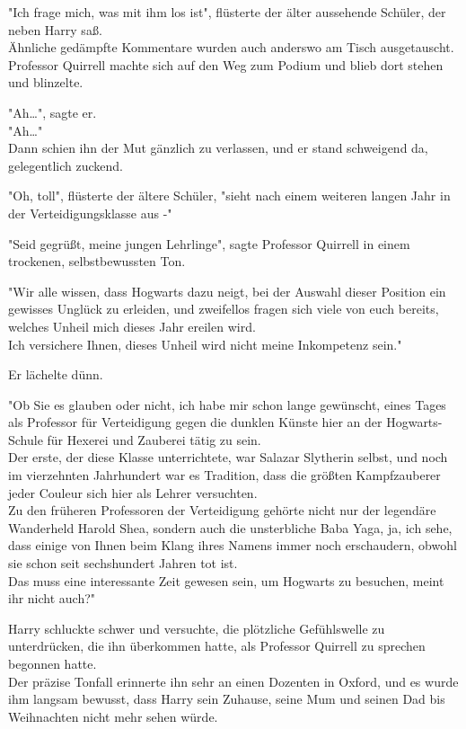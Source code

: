 {"Ich frage mich, was mit ihm los ist", flüsterte der älter aussehende Schüler, der neben Harry saß.\\ Ähnliche gedämpfte Kommentare wurden auch anderswo am Tisch ausgetauscht. Professor Quirrell machte sich auf den Weg zum Podium und blieb dort stehen und blinzelte.

"Ah…", sagte er.\\ "Ah…"\\ Dann schien ihn der Mut gänzlich zu verlassen, und er stand schweigend da, gelegentlich zuckend.

"Oh, toll", flüsterte der ältere Schüler, "sieht nach einem weiteren langen Jahr in der Verteidigungsklasse aus -"

"Seid gegrüßt, meine jungen Lehrlinge", sagte Professor Quirrell in einem trockenen, selbstbewussten Ton.

"Wir alle wissen, dass Hogwarts dazu neigt, bei der Auswahl dieser Position ein gewisses Unglück zu erleiden, und zweifellos fragen sich viele von euch bereits, welches Unheil mich dieses Jahr ereilen wird.\\ Ich versichere Ihnen, dieses Unheil wird nicht meine Inkompetenz sein."

Er lächelte dünn.

"Ob Sie es glauben oder nicht, ich habe mir schon lange gewünscht, eines Tages als Professor für Verteidigung gegen die dunklen Künste hier an der Hogwarts-Schule für Hexerei und Zauberei tätig zu sein.\\ Der erste, der diese Klasse unterrichtete, war Salazar Slytherin selbst, und noch im vierzehnten Jahrhundert war es Tradition, dass die größten Kampfzauberer jeder Couleur sich hier als Lehrer versuchten.\\ Zu den früheren Professoren der Verteidigung gehörte nicht nur der legendäre Wanderheld Harold Shea, sondern auch die unsterbliche Baba Yaga, ja, ich sehe, dass einige von Ihnen beim Klang ihres Namens immer noch erschaudern, obwohl sie schon seit sechshundert Jahren tot ist.\\ Das muss eine interessante Zeit gewesen sein, um Hogwarts zu besuchen, meint ihr nicht auch?"

Harry schluckte schwer und versuchte, die plötzliche Gefühlswelle zu unterdrücken, die ihn überkommen hatte, als Professor Quirrell zu sprechen begonnen hatte.\\ Der präzise Tonfall erinnerte ihn sehr an einen Dozenten in Oxford, und es wurde ihm langsam bewusst, dass Harry sein Zuhause, seine Mum und seinen Dad bis Weihnachten nicht mehr sehen würde.

}

